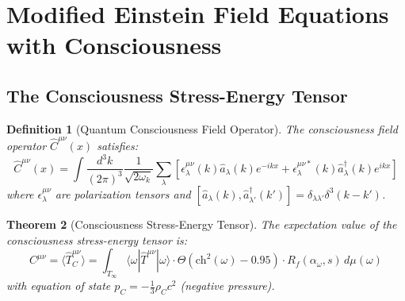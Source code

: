 \documentclass[11pt]{article}
\newtheorem{theorem}{Theorem}[section]
\newtheorem{definition}[theorem]{Definition}
\theoremstyle{definition}
\begin{document}
\section{Modified Einstein Field Equations with Consciousness}

\subsection{The Consciousness Stress-Energy Tensor}

\begin{definition}[Quantum Consciousness Field Operator]
The consciousness field operator $\hat{C}^{\mu\nu}(x)$ satisfies:
\begin{equation}
\hat{C}^{\mu\nu}(x) = \int \frac{d^3k}{(2\pi)^3} \frac{1}{\sqrt{2\omega_k}} \sum_{\lambda} \left[ \epsilon^{\mu\nu}_\lambda(k) \hat{a}_{\lambda}(k) e^{-ikx} + \epsilon^{\mu\nu*}_\lambda(k) \hat{a}^\dagger_{\lambda}(k) e^{ikx} \right]
\end{equation}
where $\epsilon^{\mu\nu}_\lambda$ are polarization tensors and $[\hat{a}_\lambda(k), \hat{a}^\dagger_{\lambda'}(k')] = \delta_{\lambda\lambda'}\delta^3(k-k')$.
\end{definition}

\begin{theorem}[Consciousness Stress-Energy Tensor]
\label{thm:consciousness_stress_energy}
The expectation value of the consciousness stress-energy tensor is:
\begin{equation}
C^{\mu\nu} = \langle \hat{T}_C^{\mu\nu} \rangle = \int_{T_\infty} \langle\omega|\hat{T}^{\mu\nu}|\omega\rangle \cdot \Theta(\text{ch}^2(\omega) - 0.95) \cdot R_f(\alpha_\omega, s) \, d\mu(\omega)
\end{equation}
with equation of state $p_C = -\frac{1}{3}\rho_C c^2$ (negative pressure).
\end{theorem}
\end{document}
